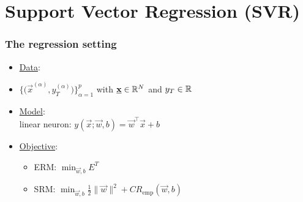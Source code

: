 \section{Support Vector Regression (SVR)}


\begin{frame}\frametitle{The regression setting}


\begin{itemize}
\item[] \underline{Data}:\\

    \item[]$
    \big\{ \big(\vec x^{(\alpha)}, y_{T}^{(\alpha)}\big)\big\}_{\alpha=1}^{p}
    $ with $\underline{\mathbf{x}} \in \mathbb{R}^{N}$ and $y_{T} \in \mathbb{R}${}

\item[] \underline{Model}:\\
    linear neuron: $
        y(\vec x; \vec w, b) = \vec w^{\top} \vec x + b$
        
\item[] \underline{Objective}:\\
    \begin{itemize}
    \item ERM: $\min_{\vec w,b} E^{T}$
    \item SRM: $\min_{\vec w,b} \frac{1}{2} \lVert \vec w \rVert^2 + C R_{\text{emp}}(\vec w,b)$
    \end{itemize}

    
\end{itemize}

\svspace{-1mm}


\end{frame}
